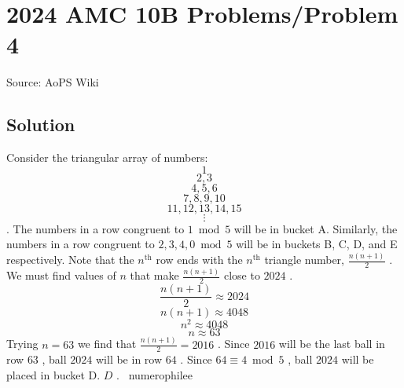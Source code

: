 \documentclass[12pt]{article}
\begin{document}
\section*{{2024 AMC 10B Problems/Problem 4}}
Source: AoPS Wiki

\subsection*{Solution}
Consider the triangular array of numbers: \[1\] \[2, 3\] \[4, 5, 6\] \[7, 8, 9, 10\] \[11, 12, 13, 14, 15\] \[\vdots\] . The numbers in a row congruent to $1 \bmod{5}$ will be in bucket A. Similarly, the numbers in a row congruent to $2, 3, 4, 0 \bmod{5}$ will be in buckets B, C, D, and E respectively. Note that the $n^\text{th}$ row ends with the $n^\text{th}$ triangle number, $\frac{n(n+1)}{2}$ . We must find values of $n$ that make $\frac{n(n+1)}{2}$ close to $2024$ . \[\frac{n(n+1)}{2} \approx 2024\] \[n(n+1) \approx 4048\] \[n^2 \approx 4048\] \[n \approx 63\] Trying $n = 63$ we find that $\frac{n(n+1)}{2} = 2016$ . Since $2016$ will be the last ball in row $63$ , ball $2024$ will be in row $64$ . Since $64 \equiv 4 \bmod{5}$ , ball $2024$ will be placed in bucket $\boxed{\text{D. } D}$ . ~numerophilee
\end{document}
